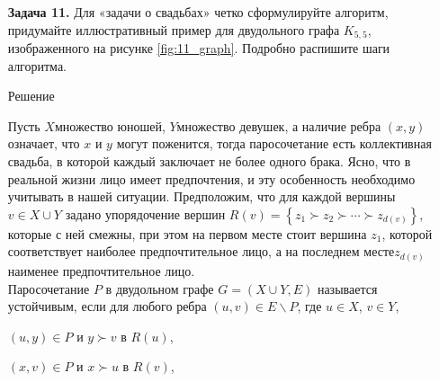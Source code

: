 \documentclass{article}
\begin{document}
\clearpage%
\begin{enumerate}
\item[\textbf{Задача 11.}]Для «задачи о свадьбах» четко сформулируйте алгоритм, придумайте иллюстративный пример для двудольного графа $K_{5,5}$, изображенного на рисунке \ref{fig:11_graph}. Подробно распишите шаги алгоритма.\\
\begin{center}
Решение 
\end{center}
Пусть $X$\quad\textendash\quad множество юношей, $Y$\quad\textendash\quad  множество девушек, а наличие ребра $(x,y)$ означает, что $x$ и $y$
могут поженится, тогда паросочетание есть коллективная свадьба, в которой каждый заключает не более одного брака. 
Ясно, что в реальной жизни лицо имеет предпочтения, и эту особенность необходимо учитывать в нашей ситуации. Предположим, что для каждой 
вершины $v \in X \cup Y$ задано упорядочение вершин 
$R(v) = \left\{z_1 \succ z_2 \succ \cdots \succ z_{d(v)} \right\} $, 
которые с ней смежны, при этом на первом месте стоит вершина
$z_1$, которой соответствует наиболее предпочтительное лицо, а на последнем месте\quad\textendash\quad$z_{d(v)}$\quad\textendash\quad наименее предпочтительное лицо.\\
Паросочетание $P$ в двудольном графе $G = (X \cup Y, E)$
называется устойчивым, если для любого ребра $(u,v)\in E\backslash P$, где $u \in X$, $v \in Y$,

\qquad{} $(u,y) \in P$ и $y \succ v$  в $R(u)$,

\qquad{} $(x,v) \in P$ и $x \succ u$  в $R(v)$,


\end{enumerate}
\end{document}
